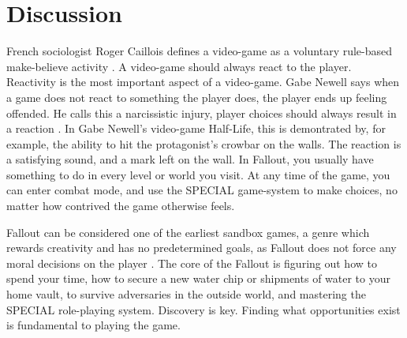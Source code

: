 
\section{Discussion}


French sociologist Roger Caillois defines a video-game as a voluntary rule-based make-believe activity \autocite{caillois_man_2001}. A video-game should always react to the player. Reactivity is the most important aspect of a video-game. Gabe Newell says when a game does not react to something the player does, the player ends up feeling offended. He calls this a narcissistic injury, player choices should always result in a reaction \autocite{gabe_narc}. In Gabe Newell's video-game Half-Life, this is demontrated by, for example, the ability to hit the protagonist's crowbar on the walls. The reaction is a satisfying sound, and a mark left on the wall. In Fallout, you usually have something to do in every level or world you visit. At any time of the game, you can enter combat mode, and use the SPECIAL game-system to make choices, no matter how contrived the game otherwise feels.

Fallout can be considered one of the earliest sandbox games, a genre which rewards creativity and has no predetermined goals, as Fallout does not force any moral decisions on the player \autocite{cain}. The core of the Fallout is figuring out how to spend your time, how to secure a new water chip or shipments of water to your home vault, to survive adversaries in the outside world, and mastering the SPECIAL role-playing system. Discovery is key. Finding what opportunities exist is fundamental to playing the game.

